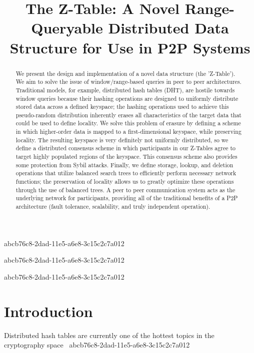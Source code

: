\documentclass[12pt]{article}
\title{The Z-Table: A Novel Range-Queryable Distributed Data Structure for Use in P2P Systems}
\begin{document}
abcb76c8-2dad-11e5-a6e8-3c15c2c7a012\maketitle

abcb76c8-2dad-11e5-a6e8-3c15c2c7a012\begin{abstract}
We present the design and implementation of a novel data structure (the 'Z-Table'). We aim to solve the issue of window/range-based queries in peer to peer architectures. Traditional models, for example,  distributed hash tables (DHT), are hostile towards window queries because their hashing operations are designed to uniformly distribute stored data across a defined keyspace; the hashing operations used to achieve this pseudo-random distribution inherently erases all characteristics of the target data that could be used to define locality. We solve this problem of erasure by defining a scheme in which higher-order data is mapped to a first-dimensional keyspace, while preserving locality. The resulting keyspace is very definitely not uniformly distributed, so we define a distributed consensus scheme in which participants in our Z-Tables agree to target highly populated regions of the keyspace. This consensus scheme also provides some protection from Sybil attacks. Finally, we define storage, lookup, and deletion operations that utilize balanced search trees to efficiently perform necessary network functions; the preservation of locality allows us to greatly optimize these operations through the use of balanced trees. A peer to peer communication system acts as the underlying network for participants, providing all of the traditional benefits of a P2P architecture (fault tolerance, scalability, and truly independent operation).
\end{abstract}
abcb76c8-2dad-11e5-a6e8-3c15c2c7a012

\newpage
\section{Introduction}
Distributed hash tables are currently one of the hottest topics in the cryptography space~\cite{Stoica:2001dj,Rowstron:2001ea,Ratnasamy:2001wn}
abcb76c8-2dad-11e5-a6e8-3c15c2c7a012
\printbibliography
\end{document}

